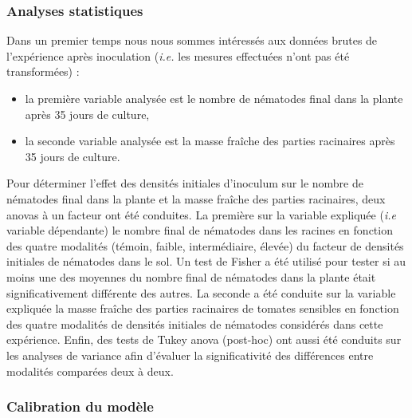 	\subsubsection{Analyses statistiques}
	Dans un premier temps nous nous sommes intéressés aux données brutes de l'expérience après inoculation (\textit{i.e.}  les mesures effectuées n'ont pas été transformées) :
\begin{itemize}
\item la première variable analysée est le nombre de nématodes final dans la plante après 35 jours de culture,
\item la seconde variable analysée est la masse fraîche  des parties racinaires après 35 jours de culture.
\end{itemize}
	
	
	
	Pour déterminer  l'effet des densités initiales d'inoculum sur le nombre de nématodes final dans la plante et la masse fraîche  des parties racinaires, deux  \glspl{anova} à un facteur ont été conduites. La première  sur la variable  expliquée (\textit{i.e} variable dépendante) le nombre final de nématodes  dans les racines   en fonction des quatre modalités (témoin, faible, intermédiaire, élevée) du facteur de densités initiales de nématodes dans le sol. Un test de Fisher a été utilisé pour tester si au moins une des moyennes du nombre final de nématodes dans la plante était significativement différente des autres. 
La seconde a été conduite sur la variable expliquée  la masse fraîche  des parties racinaires  de tomates sensibles en fonction des  quatre modalités de densités initiales de nématodes considérés dans cette expérience.  
Enfin, des tests  de Tukey \gls{anova} (post-hoc)  ont aussi été conduits sur les analyses de variance afin d'évaluer la significativité des différences entre modalités comparées deux à deux.
	
	\subsubsection{Calibration du modèle}
	
